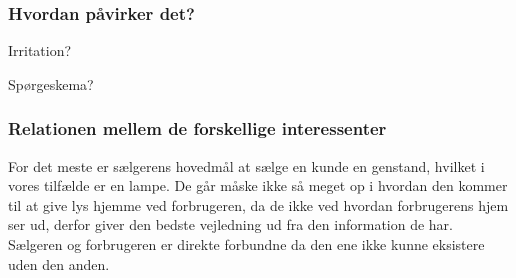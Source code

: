 \subsubsection{Hvordan påvirker det?}

Irritation?
 
Spørgeskema?
 
\subsubsection{Relationen mellem de forskellige interessenter}
For det meste er sælgerens hovedmål at sælge en kunde en genstand, hvilket i vores tilfælde er en lampe. De går måske ikke så meget op i hvordan den kommer til at give lys hjemme ved forbrugeren, da de ikke ved hvordan forbrugerens hjem ser ud, derfor giver den bedste vejledning ud fra den information de har. Sælgeren og forbrugeren er direkte forbundne da den ene ikke kunne eksistere uden den anden. 
